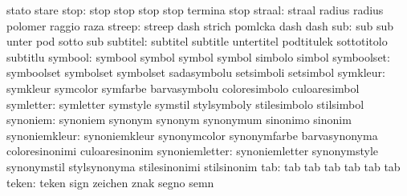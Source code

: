                            stato                     stare
                     stop: stop                      stop
                           stop                      stop
                           termina                   stop
                   straal: straal                    radius
                           radius                    polomer
                           raggio                    raza
                   streep: streep                    dash
                           strich                    pomlcka
                           dash                      dash %
                      sub: sub                       sub
                           unter                     pod
                           sotto                     sub
                 subtitel: subtitel                  subtitle
                           untertitel                podtitulek
                           sottotitolo               subtitlu
                  symbool: symbool                   symbol
                           symbol                    symbol
                           simbolo                   simbol
               symboolset: symboolset                symbolset
                           symbolset                 sadasymbolu
                           setsimboli                setsimbol
                 symkleur: symkleur                  symcolor
                           symfarbe                  barvasymbolu
                           coloresimbolo             culoaresimbol
                symletter: symletter                 symstyle
                           symstil                   stylsymboly
                           stilesimbolo              stilsimbol
                 synoniem: synoniem                  synonym
                           synonym                   synonymum
                           sinonimo                  sinonim
            synoniemkleur: synoniemkleur             synonymcolor
                           synonymfarbe              barvasynonyma
                           coloresinonimi            culoaresinonim
           synoniemletter: synoniemletter            synonymstyle
                           synonymstil               stylsynonyma
                           stilesinonimi             stilsinonim
                      tab: tab                       tab
                           tab                       tab
                           tab                       tab
                    teken: teken                     sign
                           zeichen                   znak
                           segno                     semn
